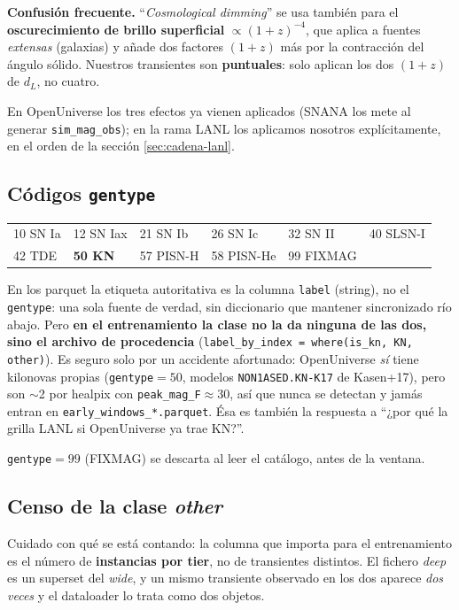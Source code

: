\documentclass[11pt,a4paper]{article}
\newcommand{\code}[1]{\texttt{\small #1}}
\newlength{\examenpad}
\newenvironment{examen}
  {\par\medskip\noindent
   \begin{lrbox}{\examenbox}%
   \begin{minipage}{\dimexpr\linewidth-2\examenpad}\small}
  {\end{minipage}%
   \end{lrbox}%
   {\setlength{\fboxsep}{\examenpad}\colorbox{boxgray}{\usebox{\examenbox}}}%
   \par\medskip}
\begin{document}
\begin{examen}
\textbf{Confusión frecuente.} ``\emph{Cosmological dimming}'' se usa también para el
\textbf{oscurecimiento de brillo superficial} $\propto (1+z)^{-4}$, que aplica a fuentes
\emph{extensas} (galaxias) y añade dos factores $(1+z)$ más por la contracción del ángulo sólido.
Nuestros transientes son \textbf{puntuales}: solo aplican los dos $(1+z)$ de $d_L$, no cuatro.
\end{examen}

En OpenUniverse los tres efectos ya vienen aplicados (SNANA los mete al generar
\code{sim\_mag\_obs}); en la rama LANL los aplicamos nosotros explícitamente, en el orden de la
sección \ref{sec:cadena-lanl}.

\subsection{Códigos \code{gentype}}
\begin{center}
\begin{tabular}{llllll}
\toprule
10 SN Ia & 12 SN Iax & 21 SN Ib & 26 SN Ic & 32 SN II & 40 SLSN-I \\
42 TDE & \textbf{50 KN} & 57 PISN-H & 58 PISN-He & 99 FIXMAG & \\
\bottomrule
\end{tabular}
\end{center}
En los parquet la etiqueta autoritativa es la columna \code{label} (string), no el \code{gentype}:
una sola fuente de verdad, sin diccionario que mantener sincronizado río abajo. Pero \textbf{en el
entrenamiento la clase no la da ninguna de las dos, sino el archivo de procedencia}
(\code{label\_by\_index = where(is\_kn, KN, other)}). Es seguro solo por un accidente afortunado:
OpenUniverse \emph{sí} tiene kilonovas propias (\code{gentype}$=50$, modelos
\code{NON1ASED.KN-K17} de Kasen+17), pero son $\sim$2 por healpix con \code{peak\_mag\_F}$\approx$30,
así que nunca se detectan y jamás entran en \code{early\_windows\_*.parquet}. Ésa es también la
respuesta a ``¿por qué la grilla LANL si OpenUniverse ya trae KN?''.

\code{gentype}$=99$ (FIXMAG) se descarta al leer el catálogo, antes de la ventana.

\subsection{Censo de la clase \emph{other}}
\label{sec:censo}
Cuidado con qué se está contando: la columna que importa para el entrenamiento es el número de
\textbf{instancias por tier}, no de transientes distintos. El fichero \emph{deep} es un superset del
\emph{wide}, y un mismo transiente observado en los dos aparece \emph{dos veces} y el dataloader lo
trata como dos objetos.
\end{document}
